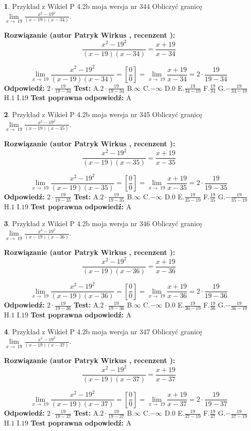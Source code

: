\documentclass[12pt, a4paper]{article}
\theoremstyle{definition} %
\newtheorem{zad}{}
\newcommand{\zadStart}[1]{\begin{zad}#1\newline}
\newcommand{\zadStop}{\end{zad}}
\newcommand{\rozwStart}[2]{\noindent \textbf{Rozwiązanie (autor #1 , recenzent #2): }\newline}
\newcommand{\rozwStop}{\newline}
\newcommand{\odpStart}{\noindent \textbf{Odpowiedź:}\newline}
\newcommand{\odpStop}{\newline}
\newcommand{\testStart}{\noindent \textbf{Test:}\newline}
\newcommand{\testStop}{\newline}
\newcommand{\kluczStart}{\noindent \textbf{Test poprawna odpowiedź:}\newline}
\newcommand{\kluczStop}{\newline}
\begin{document}
\zadStart{Przykład z Wikieł P 4.2b moja wersja nr 344}
Obliczyć granicę $\lim\limits_{x\to\ 19}\frac{x^{2}-19^{2}}{(x-19)(x-34)}$.
\zadStop
\rozwStart{Patryk Wirkus}{}
$$\frac{x^{2}-19^{2}}{(x-19)(x-34)}=\frac{x+19}{x-34}$$

$$\lim\limits_{x\to\ 19}\frac{x^{2}-19^{2}}{(x-19)(x-34)}=[\frac{0}{0}]=\lim\limits_{x\to\ 19}\frac{x+19}{x-34}=2 \cdot \frac{19}{19-34}$$
\rozwStop
\odpStart
$2 \cdot \frac{19}{19-34}$
\odpStop
\testStart
A.$2 \cdot \frac{19}{19-34}$
B.$\infty$
C.$-\infty$
D.$0$
E.$\frac{19}{34-19}$
F.$\frac{19}{34}$
G.$-\frac{19}{34-19}$
H.$1$
I.$19$
\testStop
\kluczStart
A
\kluczStop



\zadStart{Przykład z Wikieł P 4.2b moja wersja nr 345}
Obliczyć granicę $\lim\limits_{x\to\ 19}\frac{x^{2}-19^{2}}{(x-19)(x-35)}$.
\zadStop
\rozwStart{Patryk Wirkus}{}
$$\frac{x^{2}-19^{2}}{(x-19)(x-35)}=\frac{x+19}{x-35}$$

$$\lim\limits_{x\to\ 19}\frac{x^{2}-19^{2}}{(x-19)(x-35)}=[\frac{0}{0}]=\lim\limits_{x\to\ 19}\frac{x+19}{x-35}=2 \cdot \frac{19}{19-35}$$
\rozwStop
\odpStart
$2 \cdot \frac{19}{19-35}$
\odpStop
\testStart
A.$2 \cdot \frac{19}{19-35}$
B.$\infty$
C.$-\infty$
D.$0$
E.$\frac{19}{35-19}$
F.$\frac{19}{35}$
G.$-\frac{19}{35-19}$
H.$1$
I.$19$
\testStop
\kluczStart
A
\kluczStop



\zadStart{Przykład z Wikieł P 4.2b moja wersja nr 346}
Obliczyć granicę $\lim\limits_{x\to\ 19}\frac{x^{2}-19^{2}}{(x-19)(x-36)}$.
\zadStop
\rozwStart{Patryk Wirkus}{}
$$\frac{x^{2}-19^{2}}{(x-19)(x-36)}=\frac{x+19}{x-36}$$

$$\lim\limits_{x\to\ 19}\frac{x^{2}-19^{2}}{(x-19)(x-36)}=[\frac{0}{0}]=\lim\limits_{x\to\ 19}\frac{x+19}{x-36}=2 \cdot \frac{19}{19-36}$$
\rozwStop
\odpStart
$2 \cdot \frac{19}{19-36}$
\odpStop
\testStart
A.$2 \cdot \frac{19}{19-36}$
B.$\infty$
C.$-\infty$
D.$0$
E.$\frac{19}{36-19}$
F.$\frac{19}{36}$
G.$-\frac{19}{36-19}$
H.$1$
I.$19$
\testStop
\kluczStart
A
\kluczStop



\zadStart{Przykład z Wikieł P 4.2b moja wersja nr 347}
Obliczyć granicę $\lim\limits_{x\to\ 19}\frac{x^{2}-19^{2}}{(x-19)(x-37)}$.
\zadStop
\rozwStart{Patryk Wirkus}{}
$$\frac{x^{2}-19^{2}}{(x-19)(x-37)}=\frac{x+19}{x-37}$$

$$\lim\limits_{x\to\ 19}\frac{x^{2}-19^{2}}{(x-19)(x-37)}=[\frac{0}{0}]=\lim\limits_{x\to\ 19}\frac{x+19}{x-37}=2 \cdot \frac{19}{19-37}$$
\rozwStop
\odpStart
$2 \cdot \frac{19}{19-37}$
\odpStop
\testStart
A.$2 \cdot \frac{19}{19-37}$
B.$\infty$
C.$-\infty$
D.$0$
E.$\frac{19}{37-19}$
F.$\frac{19}{37}$
G.$-\frac{19}{37-19}$
H.$1$
I.$19$
\testStop
\kluczStart
A
\kluczStop
\end{document}

